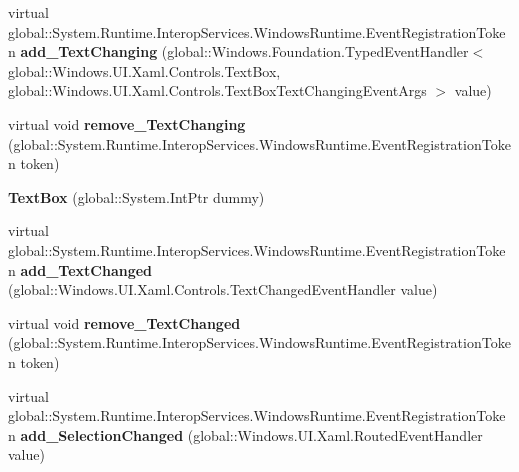 \begin{DoxyCompactItemize}
\mbox{\label{class_windows_1_1_u_i_1_1_xaml_1_1_controls_1_1_text_box_acb77f51967d36ae23348c70a69fb0313}} 
virtual global\+::\+System.\+Runtime.\+Interop\+Services.\+Windows\+Runtime.\+Event\+Registration\+Token {\bfseries add\+\_\+\+Text\+Changing} (global\+::\+Windows.\+Foundation.\+Typed\+Event\+Handler$<$ global\+::\+Windows.\+U\+I.\+Xaml.\+Controls.\+Text\+Box, global\+::\+Windows.\+U\+I.\+Xaml.\+Controls.\+Text\+Box\+Text\+Changing\+Event\+Args $>$ value)
\item 
\mbox{\label{class_windows_1_1_u_i_1_1_xaml_1_1_controls_1_1_text_box_aacef19be208dde1a5d0585bc1113f0bd}} 
virtual void {\bfseries remove\+\_\+\+Text\+Changing} (global\+::\+System.\+Runtime.\+Interop\+Services.\+Windows\+Runtime.\+Event\+Registration\+Token token)
\item 
\mbox{\label{class_windows_1_1_u_i_1_1_xaml_1_1_controls_1_1_text_box_adcfa94babf525333e555cfc9f2b34314}} 
{\bfseries Text\+Box} (global\+::\+System.\+Int\+Ptr dummy)
\item 
\mbox{\label{class_windows_1_1_u_i_1_1_xaml_1_1_controls_1_1_text_box_a206b2889087ba0dbfe818431045788ff}} 
virtual global\+::\+System.\+Runtime.\+Interop\+Services.\+Windows\+Runtime.\+Event\+Registration\+Token {\bfseries add\+\_\+\+Text\+Changed} (global\+::\+Windows.\+U\+I.\+Xaml.\+Controls.\+Text\+Changed\+Event\+Handler value)
\item 
\mbox{\label{class_windows_1_1_u_i_1_1_xaml_1_1_controls_1_1_text_box_a35ae456324ad400806b770d7c47c57b4}} 
virtual void {\bfseries remove\+\_\+\+Text\+Changed} (global\+::\+System.\+Runtime.\+Interop\+Services.\+Windows\+Runtime.\+Event\+Registration\+Token token)
\item 
\mbox{\label{class_windows_1_1_u_i_1_1_xaml_1_1_controls_1_1_text_box_aa7a814e90af6bc70d3d39b87e1dcc130}} 
virtual global\+::\+System.\+Runtime.\+Interop\+Services.\+Windows\+Runtime.\+Event\+Registration\+Token {\bfseries add\+\_\+\+Selection\+Changed} (global\+::\+Windows.\+U\+I.\+Xaml.\+Routed\+Event\+Handler value)

\end{DoxyCompactItemize}
